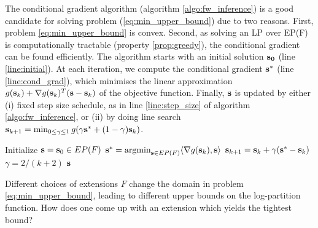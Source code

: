  The conditional gradient algorithm
(algorithm \ref{algo:fw_inference}) \citep{frank1956algorithm} is a good
candidate for solving problem (\ref{eq:min_upper_bound}) due to two reasons.
First, problem \eqref{eq:min_upper_bound} is convex. Second, as solving an LP over EP(F) is computationally tractable (property \ref{prop:greedy}), the conditional gradient can be found efficiently. The algorithm starts with an initial solution $\bf s_0$ (line \ref{line:initial}). At each iteration, we compute the conditional gradient $\bf s^*$ (line \ref{line:cond_grad}), which minimises the linear approximation $g({\bf s}_k) + \nabla g({\bf s}_k)^T ({\bf s} - {\bf s}_k)$ of the objective function. Finally, $\bf s$ is updated by either (i) fixed step size schedule, as in line \ref{line:step_size} of algorithm \ref{algo:fw_inference}, or (ii) by doing line search ${\bf s}_{k+1} = \min_{0 \leq \gamma \leq 1} g(\gamma {\bf s}^* + (1 - \gamma) {\bf s}_{k})$.

\begin{algorithm}
\label{algo:fw_inference}
\begin{algorithmic}[1]
    \STATE Initialize ${\bf s} = {\bf s}_0 \in EP(F)$ \label{line:initial}
\STATE ${\bf s^*} = \operatorname*{argmin}_{{\bf s} \in EP(F)} \langle \nabla g({\bf s}_k), {\bf s} \rangle$ \label{line:cond_grad}
\ENDIF
\STATE ${\bf s}_{k + 1} = {\bf s}_k + \gamma({\bf s^*} - {\bf s}_k)$  $\gamma = 2/(k + 2)$ \label{line:step_size}
\ENDFOR   
\RETURN $\bf s$
\end{algorithmic}
\end{algorithm}


 Different choices of extensions $F$ change the domain in problem \eqref{eq:min_upper_bound}, leading to different upper bounds on the log-partition function. How does one come up with an extension which yields the tightest bound? 

